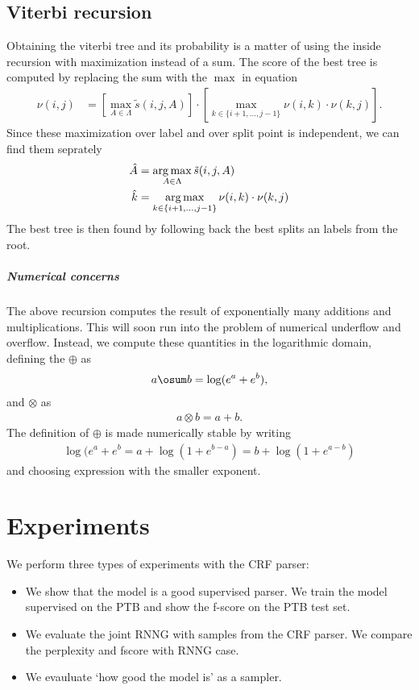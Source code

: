 \subsection{Viterbi recursion}
Obtaining the viterbi tree and its probability is a matter of using the inside recursion with maximization instead of a sum. The score of the best tree is  computed by replacing the sum with the $\max$ in equation
\begin{align*}
\label{eq:viterbi-score}
  \nu(i,j)
    &= [ \max_{A \in \Lambda} \tilde{s}(i, j, A) ] \cdot [\max_{ k \in \{ i+1, \dots, j-1 \} } \nu(i,k) \cdot  \nu(k,j) ].
\end{align*}
Since these maximization over label and over split point is independent, we can find them seprately
\begin{align*}
\label{eq:viterbi-tree}
  \hat{A} &= \operatorname*{arg\,max}_{ A \in \Lambda } \tilde{s}(i, j, A)  \\
  \hat{k} &= \operatorname*{arg\,max}_{ k \in \{ i+1, \dots, j-1 \} } \nu(i, k) \cdot \nu(k, j)
\end{align*}
The best tree is then found by following back the best splits an labels from the root.

\subparagraph{Numerical concerns}
The above recursion computes the result of exponentially many additions and multiplications. This will soon run into the problem of numerical underflow and overflow. Instead, we compute these quantities in the logarithmic domain, defining the $\oplus$ as
\begin{align*}
  a \osum b = \log(e^{a} + e^{b}),
\end{align*}
and $\otimes$ as
\begin{align*}
  a \otimes b = a + b.
\end{align*}
The definition of $\oplus$ is made numerically stable by writing
\begin{align*}
  \log(e^{a} + e^{b} = a + \log(1 + e^{b-a}) = b + \log(1 + e^{a-b})
\end{align*}
and choosing expression with the smaller exponent.


\section{Experiments}
We perform three types of experiments with the CRF parser:
\begin{itemize}
  \item We show that the model is a good supervised parser. We train the model supervised on the PTB and show the f-score on the PTB test set.
  \item We evaluate the joint RNNG with samples from the CRF parser. We compare the perplexity and fscore with RNNG case.
  \item We evauluate `how good the model is' as a sampler.
\end{itemize}

